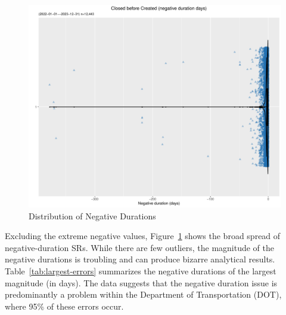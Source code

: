 \documentclass[linenumber]{jdsart}
\begin{document}
\begin{figure}[tbp]
	 \centering
 	 \includegraphics[width=\textwidth]{negative_duration_SR_violin.pdf}
 \caption{Distribution of Negative Durations}
 \label{fig:negative-duration-violin}
\end{figure}


Excluding the extreme negative values, 
Figure~\ref{fig:negative-duration-violin} shows the broad spread of 
negative-duration SRs. While there are few outliers, the magnitude 
of the negative durations is troubling and can produce bizarre 
analytical results. Table~\ref{tab:largest-errors} summarizes the 
negative durations of the largest magnitude (in days). The data 
suggests that the negative duration issue is predominantly a problem 
within the Department of Transportation (DOT), where 95\% of these 
errors occur.


		
		
    
\end{document}
